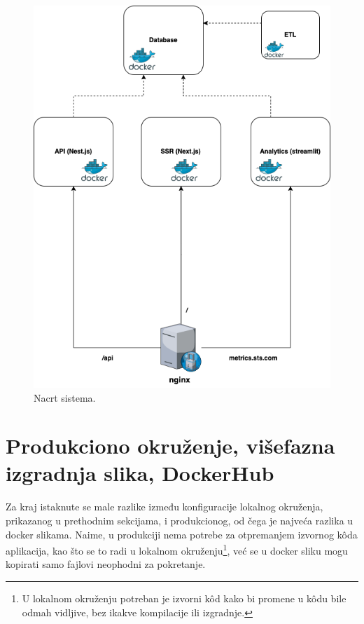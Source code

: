 \documentclass[12pt,oneside]{memoir}
\begin{document}
\begin{figure}[h, width=0.5]
  \centering
  \includegraphics[width=1\textwidth]{docs/images/ch_6/dockernadnginxfinal.png} 
  \caption{Nacrt sistema.}
  \label{fig:dockerandnginxfinal}
\end{figure}


\newpage
\section{Produkciono okruženje, višefazna izgradnja slika, DockerHub}

Za kraj istaknute se male razlike između konfiguracije lokalnog okruženja, prikazanog u prethodnim sekcijama, i produkcionog, od čega je najveća razlika u docker slikama. Naime, u produkciji nema potrebe za otpremanjem izvornog k\^{o}da aplikacija, kao što se to radi u lokalnom okruženju\footnote{U lokalnom okruženju potreban je izvorni k\^{o}d kako bi promene u k\^{o}du bile odmah vidljive, bez ikakve kompilacije ili izgradnje.}, već se u docker sliku mogu kopirati samo fajlovi neophodni za pokretanje.
\end{document}
